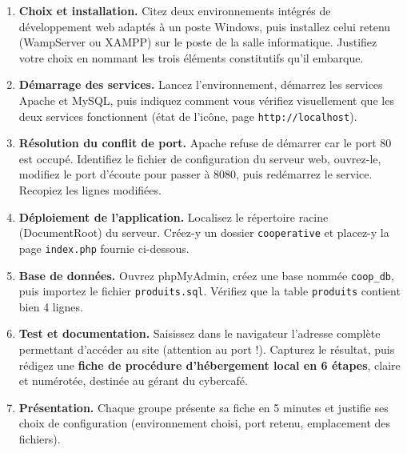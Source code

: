 \documentclass[11pt]{article}
\newcounter{popsec}
\newcounter{popsub}
\newcommand{\courssub}[1]{%
  \stepcounter{popsub}%
  \par\vspace{9pt}\noindent{\popxbold\fontsize{11.5}{13}\selectfont\color{popink}{\color{poporange}\thepopsec.\thepopsub}\hspace{6pt}#1}\par\nopagebreak\vspace{4pt}
}
\begin{document}
\begin{enumerate}
\item \textbf{Choix et installation.} Citez deux environnements intégrés de développement web adaptés à un poste Windows, puis installez celui retenu (WampServer ou XAMPP) sur le poste de la salle informatique. Justifiez votre choix en nommant les trois éléments constitutifs qu'il embarque.
\item \textbf{Démarrage des services.} Lancez l'environnement, démarrez les services Apache et MySQL, puis indiquez comment vous vérifiez visuellement que les deux services fonctionnent (état de l'icône, page \texttt{http://localhost}).
\item \textbf{Résolution du conflit de port.} Apache refuse de démarrer car le port 80 est occupé. Identifiez le fichier de configuration du serveur web, ouvrez-le, modifiez le port d'écoute pour passer à 8080, puis redémarrez le service. Recopiez les lignes modifiées.
\item \textbf{Déploiement de l'application.} Localisez le répertoire racine (DocumentRoot) du serveur. Créez-y un dossier \texttt{cooperative} et placez-y la page \texttt{index.php} fournie ci-dessous.
\item \textbf{Base de données.} Ouvrez phpMyAdmin, créez une base nommée \texttt{coop\_db}, puis importez le fichier \texttt{produits.sql}. Vérifiez que la table \texttt{produits} contient bien 4 lignes.
\item \textbf{Test et documentation.} Saisissez dans le navigateur l'adresse complète permettant d'accéder au site (attention au port !). Capturez le résultat, puis rédigez une \textbf{fiche de procédure d'hébergement local en 6 étapes}, claire et numérotée, destinée au gérant du cybercafé.
\item \textbf{Présentation.} Chaque groupe présente sa fiche en 5 minutes et justifie ses choix de configuration (environnement choisi, port retenu, emplacement des fichiers).
\end{enumerate}

\courssub{Ressources à mobiliser}
\end{document}
